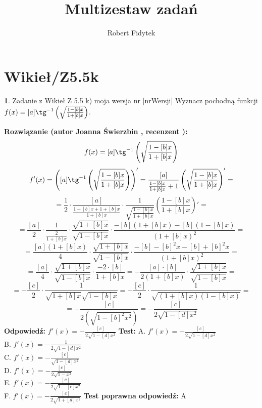 \documentclass[12pt, a4paper]{article}
\title{Multizestaw zadań}
\author{Robert Fidytek}
\date{}
\theoremstyle{definition} %
\newtheorem{zad}{}
\newcommand{\kategoria}[1]{\section{#1}} %
\newcommand{\zadStart}[1]{\begin{zad}#1\newline} %
\newcommand{\zadStop}{\end{zad}}   %
\newcommand{\rozwStart}[2]{\noindent \textbf{Rozwiązanie (autor #1 , recenzent #2): }\newline} %
\newcommand{\rozwStop}{\newline}                                            %
\newcommand{\odpStart}{\noindent \textbf{Odpowiedź:}\newline}    %
\newcommand{\odpStop}{\newline}                                             %
\newcommand{\testStart}{\noindent \textbf{Test:}\newline} %
\newcommand{\testStop}{\newline} %
\newcommand{\kluczStart}{\noindent \textbf{Test poprawna odpowiedź:}\newline} %
\newcommand{\kluczStop}{\newline} %
\begin{document}
\maketitle


\kategoria{Wikieł/Z5.5k}
\zadStart{Zadanie z Wikieł Z 5.5 k) moja wersja nr [nrWersji]}
Wyznacz pochodną funkcji \\ $f(x)=[a] \tg^{-1}\left( \sqrt{\frac{1-[b]x}{1+[b]x}} \right)$.
\zadStop
\rozwStart{Joanna Świerzbin}{}
$$f(x)=[a] \tg^{-1}\left( \sqrt{\frac{1-[b]x}{1+[b]x}} \right)$$
$$f'(x)= \left( [a] \tg^{-1}\left( \sqrt{\frac{1-[b]x}{1+[b]x}} \right) \right)'  = \frac{[a]}{\frac{1-[b]x}{1+[b]x}+1} \left( \sqrt{\frac{1-[b]x}{1+[b]x}} \right)' =$$
$$ =\frac{1}{2} \cdot \frac{[a]}{\frac{1-[b]x+1+[b]x}{1+[b]x}}\cdot \frac{1}{\sqrt{\frac{1-[b]x}{1+[b]x}}} \left( \frac{1-[b]x}{1+[b]x} \right)' =$$
$$ = \frac{[a]}{2} \cdot \frac{1}{\frac{2}{1+[b]x}} \cdot \frac{\sqrt{1+[b]x}}{\sqrt{1-[b]x}} \cdot \frac{-[b](1+[b]x)-[b](1-[b]x)}{(1+[b]x)^2} =$$
$$ = \frac{[a](1+[b]x)}{4} \cdot \frac{\sqrt{1+[b]x}}{\sqrt{1-[b]x}} \cdot \frac{-[b]-[b]^2x-[b]+[b]^2x}{(1+[b]x)^2} =$$
$$ = \frac{[a]}{4} \cdot \frac{\sqrt{1+[b]x}}{\sqrt{1-[b]x}} \cdot \frac{-2\cdot[b]}{1+[b]x} = - \frac{[a]\cdot[b]}{2(1+[b]x)} \cdot \frac{\sqrt{1+[b]x}}{\sqrt{1-[b]x}} =$$
$$ = - \frac{[c]}{2} \cdot \frac{1}{\sqrt{1+[b]x}\sqrt{1-[b]x}} = - \frac{[c]}{2} \cdot \frac{1}{\sqrt{(1+[b]x)(1-[b]x)}} =$$
$$ = - \frac{[c]}{2 (\sqrt{1-[b]^2x^2})} = - \frac{[c]}{2 \sqrt{1-[d]x^2}}$$
\rozwStop
\odpStart
$ f'(x) =  - \frac{[c]}{2 \sqrt{1-[d]x^2}} $
\odpStop
\testStart
A. $ f'(x) =  - \frac{[c]}{2 \sqrt{1-[d]x^2}} $\\
B. $ f'(x) =  - \frac{1}{2 \sqrt{1-[d]x^2}} $ \\
C. $ f'(x) =  - \frac{[c]}{\sqrt{1-[d]x^2}} $\\
D. $ f'(x) =  - \frac{[c]}{2 \sqrt{1-x^2}} $\\
E. $ f'(x) =  - \frac{[c]}{2 \sqrt{1-[c]x^2}} $\\
F. $ f'(x) =  - \frac{[c]}{2 \sqrt{1+[d]x^2}} $
\testStop
\kluczStart
A
\kluczStop
\end{document}
